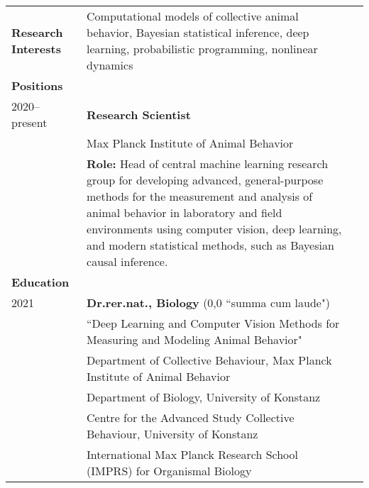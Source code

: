 \documentclass[letterpaper,10pt,oneside]{article}
\begin{document}
\begin{small}
\noindent \begin{longtable}{@{} l p{5.3in}l}

\large{\textbf{Research Interests}}
& Computational models of collective animal behavior, Bayesian statistical inference, deep learning, probabilistic programming, nonlinear dynamics \vspace{2mm}\\ 

\Large{\textbf{Positions}} \vspace{5mm} \\
\large{2020--present} 
& \textbf{Research Scientist} \\
& {Max Planck Institute of Animal Behavior} \\
& \textbf{Role:} Head of central machine learning research group for developing advanced, general-purpose methods for the measurement and analysis of animal behavior in laboratory and field environments using computer vision, deep learning, and modern statistical methods, such as Bayesian causal inference. \\

\Large{\textbf{Education}} \vspace{5mm} \\
 \large{2021} 
 & \textbf{Dr.rer.nat., Biology} (0,0 ``summa cum laude")\\
 & ``Deep Learning and Computer Vision Methods for Measuring and Modeling Animal Behavior" \\
 & {Department of Collective Behaviour, Max Planck Institute of Animal Behavior} \\
  & {Department of Biology, University of Konstanz} \\
    & {Centre for the Advanced Study Collective Behaviour, University of Konstanz} \\
 	& {International Max Planck Research School (IMPRS) for Organismal Biology} \\
     

\end{longtable}
\end{small}
\end{document}
